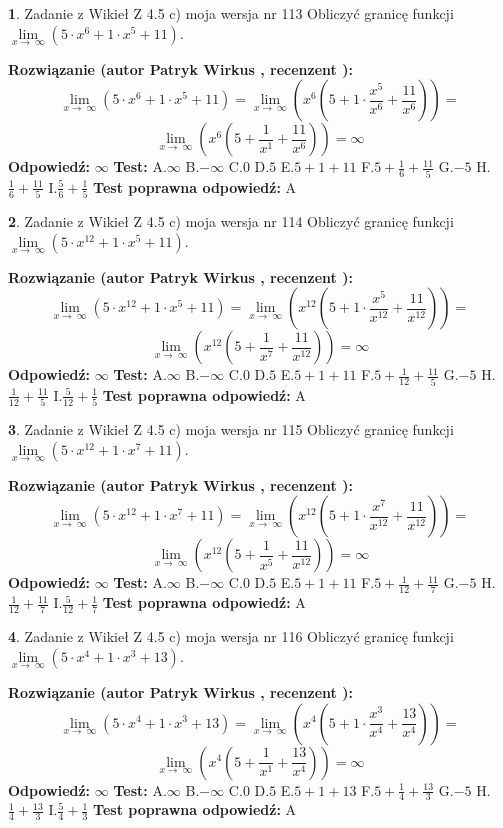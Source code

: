 \documentclass[12pt, a4paper]{article}
\theoremstyle{definition} %
\newtheorem{zad}{}
\newcommand{\zadStart}[1]{\begin{zad}#1\newline}
\newcommand{\zadStop}{\end{zad}}
\newcommand{\rozwStart}[2]{\noindent \textbf{Rozwiązanie (autor #1 , recenzent #2): }\newline}
\newcommand{\rozwStop}{\newline}
\newcommand{\odpStart}{\noindent \textbf{Odpowiedź:}\newline}
\newcommand{\odpStop}{\newline}
\newcommand{\testStart}{\noindent \textbf{Test:}\newline}
\newcommand{\testStop}{\newline}
\newcommand{\kluczStart}{\noindent \textbf{Test poprawna odpowiedź:}\newline}
\newcommand{\kluczStop}{\newline}
\begin{document}
\zadStart{Zadanie z Wikieł Z 4.5 c) moja wersja nr 113}
Obliczyć granicę funkcji  $\lim\limits_{x\to\ \infty}(5 \cdot x^{6}+1 \cdot x^{5}+11)$.
\zadStop
\rozwStart{Patryk Wirkus}{}
$$\lim\limits_{x\to\ \infty}(5 \cdot x^{6}+1 \cdot x^{5}+11) = \lim\limits_{x\to\ \infty}(x^{6}(5 +1 \cdot \frac{x^{5}}{x^{6}}+\frac{11}{x^{6}})) =$$ $$\lim\limits_{x\to\ \infty}(x^{6}(5 +\frac{1}{x^{1}}+\frac{11}{x^{6}})) =\infty$$
\rozwStop
\odpStart
$\infty$
\odpStop
\testStart
A.$\infty$ B.$-\infty$ C.$0$ D.$5$ E.$5 + 1 + 11$
F.$5+\frac{1}{6}+\frac{11}{5}$ G.$-5$
H.$\frac{1}{6}+\frac{11}{5}$
I.$\frac{5}{6}+\frac{1}{5}$
\testStop
\kluczStart
A
\kluczStop



\zadStart{Zadanie z Wikieł Z 4.5 c) moja wersja nr 114}
Obliczyć granicę funkcji  $\lim\limits_{x\to\ \infty}(5 \cdot x^{12}+1 \cdot x^{5}+11)$.
\zadStop
\rozwStart{Patryk Wirkus}{}
$$\lim\limits_{x\to\ \infty}(5 \cdot x^{12}+1 \cdot x^{5}+11) = \lim\limits_{x\to\ \infty}(x^{12}(5 +1 \cdot \frac{x^{5}}{x^{12}}+\frac{11}{x^{12}})) =$$ $$\lim\limits_{x\to\ \infty}(x^{12}(5 +\frac{1}{x^{7}}+\frac{11}{x^{12}})) =\infty$$
\rozwStop
\odpStart
$\infty$
\odpStop
\testStart
A.$\infty$ B.$-\infty$ C.$0$ D.$5$ E.$5 + 1 + 11$
F.$5+\frac{1}{12}+\frac{11}{5}$ G.$-5$
H.$\frac{1}{12}+\frac{11}{5}$
I.$\frac{5}{12}+\frac{1}{5}$
\testStop
\kluczStart
A
\kluczStop



\zadStart{Zadanie z Wikieł Z 4.5 c) moja wersja nr 115}
Obliczyć granicę funkcji  $\lim\limits_{x\to\ \infty}(5 \cdot x^{12}+1 \cdot x^{7}+11)$.
\zadStop
\rozwStart{Patryk Wirkus}{}
$$\lim\limits_{x\to\ \infty}(5 \cdot x^{12}+1 \cdot x^{7}+11) = \lim\limits_{x\to\ \infty}(x^{12}(5 +1 \cdot \frac{x^{7}}{x^{12}}+\frac{11}{x^{12}})) =$$ $$\lim\limits_{x\to\ \infty}(x^{12}(5 +\frac{1}{x^{5}}+\frac{11}{x^{12}})) =\infty$$
\rozwStop
\odpStart
$\infty$
\odpStop
\testStart
A.$\infty$ B.$-\infty$ C.$0$ D.$5$ E.$5 + 1 + 11$
F.$5+\frac{1}{12}+\frac{11}{7}$ G.$-5$
H.$\frac{1}{12}+\frac{11}{7}$
I.$\frac{5}{12}+\frac{1}{7}$
\testStop
\kluczStart
A
\kluczStop



\zadStart{Zadanie z Wikieł Z 4.5 c) moja wersja nr 116}
Obliczyć granicę funkcji  $\lim\limits_{x\to\ \infty}(5 \cdot x^{4}+1 \cdot x^{3}+13)$.
\zadStop
\rozwStart{Patryk Wirkus}{}
$$\lim\limits_{x\to\ \infty}(5 \cdot x^{4}+1 \cdot x^{3}+13) = \lim\limits_{x\to\ \infty}(x^{4}(5 +1 \cdot \frac{x^{3}}{x^{4}}+\frac{13}{x^{4}})) =$$ $$\lim\limits_{x\to\ \infty}(x^{4}(5 +\frac{1}{x^{1}}+\frac{13}{x^{4}})) =\infty$$
\rozwStop
\odpStart
$\infty$
\odpStop
\testStart
A.$\infty$ B.$-\infty$ C.$0$ D.$5$ E.$5 + 1 + 13$
F.$5+\frac{1}{4}+\frac{13}{3}$ G.$-5$
H.$\frac{1}{4}+\frac{13}{3}$
I.$\frac{5}{4}+\frac{1}{3}$
\testStop
\kluczStart
A
\kluczStop
\end{document}
